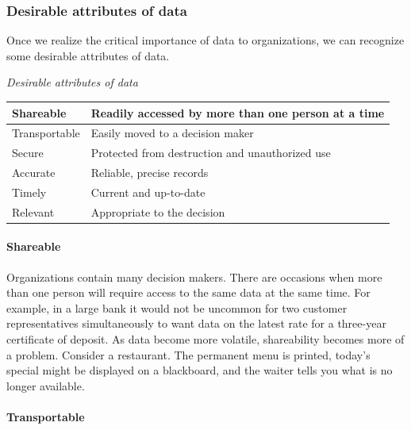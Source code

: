 \documentclass[
]{article}
\begin{document}
\hypertarget{desirable-attributes-of-data}{%
\subsubsection*{Desirable attributes of data}\label{desirable-attributes-of-data}}

Once we realize the critical importance of data to organizations, we can
recognize some desirable attributes of data.

\emph{Desirable attributes of data}

\begin{longtable}[]{@{}ll@{}}
\toprule
Shareable & Readily accessed by more than one person at a time \\
\midrule
\endhead
Transportable & Easily moved to a decision maker \\
Secure & Protected from destruction and unauthorized use \\
Accurate & Reliable, precise records \\
Timely & Current and up-to-date \\
Relevant & Appropriate to the decision \\
\bottomrule
\end{longtable}

\hypertarget{shareable}{%
\paragraph*{Shareable}\label{shareable}}

Organizations contain many decision makers. There are occasions when
more than one person will require access to the same data at the same
time. For example, in a large bank it would not be uncommon for two
customer representatives simultaneously to want data on the latest rate
for a three-year certificate of deposit. As data become more volatile,
shareability becomes more of a problem. Consider a restaurant. The
permanent menu is printed, today's special might be displayed on a
blackboard, and the waiter tells you what is no longer available.

\hypertarget{transportable}{%
\paragraph*{Transportable}\label{transportable}}
\end{document}
